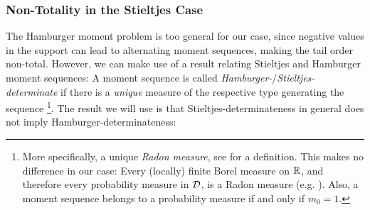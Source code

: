\documentclass[a4paper]{scrreprt}
\theoremstyle{definition}
\newtheorem{thm}{Theorem}[chapter] %
\begin{document}
%    

    \subsubsection{Non-Totality in the Stieltjes Case}
    The Hamburger moment problem is too general for our case, since negative values in the support can lead to alternating moment sequences, making the tail order non-total.
    However, we can make use of a result relating Stieltjes and Hamburger moment sequences:
    A moment sequence is called \emph{Hamburger-}/\emph{Stieltjes-determinate} if there is a \emph{unique} measure of the respective type generating the sequence \cite[p.68]{bib:schmuedgenTheMomentProblem}
    \footnote{More specifically, a unique \emph{Radon measure}, see \cite[A.1]{bib:schmuedgenTheMomentProblem} for a definition. This makes no difference in our case: Every (locally) finite Borel measure on $\mathbb{R}$, and therefore every probability measure in $\mathcal{D}$, is a Radon measure (e.g. \cite[Proposition II.3.1]{bib:malliavinIntegrationAndProbability}). Also, a moment sequence belongs to a probability measure if and only if $m_0 = 1$.}.
    The result we will use is that Stieltjes-determinateness in general does not imply Hamburger-determinateness:
    
\end{document}
